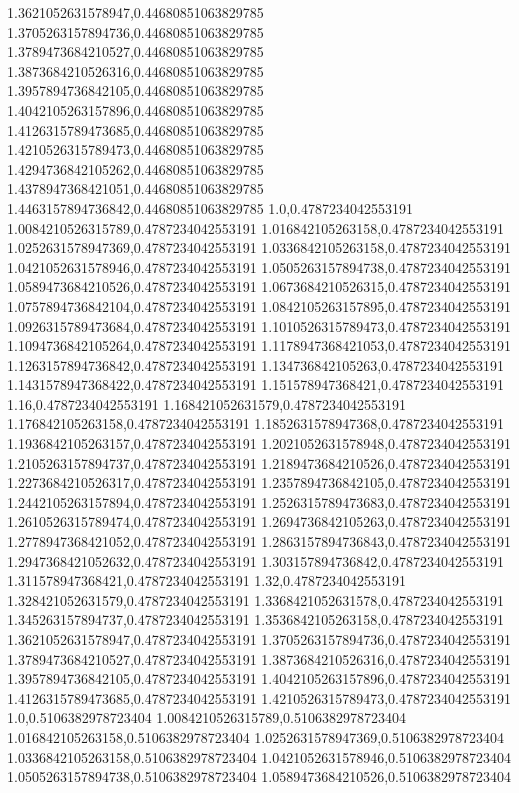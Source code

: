 1.3621052631578947,0.44680851063829785
1.3705263157894736,0.44680851063829785
1.3789473684210527,0.44680851063829785
1.3873684210526316,0.44680851063829785
1.3957894736842105,0.44680851063829785
1.4042105263157896,0.44680851063829785
1.4126315789473685,0.44680851063829785
1.4210526315789473,0.44680851063829785
1.4294736842105262,0.44680851063829785
1.4378947368421051,0.44680851063829785
1.4463157894736842,0.44680851063829785
1.0,0.4787234042553191
1.0084210526315789,0.4787234042553191
1.016842105263158,0.4787234042553191
1.0252631578947369,0.4787234042553191
1.0336842105263158,0.4787234042553191
1.0421052631578946,0.4787234042553191
1.0505263157894738,0.4787234042553191
1.0589473684210526,0.4787234042553191
1.0673684210526315,0.4787234042553191
1.0757894736842104,0.4787234042553191
1.0842105263157895,0.4787234042553191
1.0926315789473684,0.4787234042553191
1.1010526315789473,0.4787234042553191
1.1094736842105264,0.4787234042553191
1.1178947368421053,0.4787234042553191
1.1263157894736842,0.4787234042553191
1.134736842105263,0.4787234042553191
1.1431578947368422,0.4787234042553191
1.151578947368421,0.4787234042553191
1.16,0.4787234042553191
1.168421052631579,0.4787234042553191
1.176842105263158,0.4787234042553191
1.1852631578947368,0.4787234042553191
1.1936842105263157,0.4787234042553191
1.2021052631578948,0.4787234042553191
1.2105263157894737,0.4787234042553191
1.2189473684210526,0.4787234042553191
1.2273684210526317,0.4787234042553191
1.2357894736842105,0.4787234042553191
1.2442105263157894,0.4787234042553191
1.2526315789473683,0.4787234042553191
1.2610526315789474,0.4787234042553191
1.2694736842105263,0.4787234042553191
1.2778947368421052,0.4787234042553191
1.2863157894736843,0.4787234042553191
1.2947368421052632,0.4787234042553191
1.303157894736842,0.4787234042553191
1.311578947368421,0.4787234042553191
1.32,0.4787234042553191
1.328421052631579,0.4787234042553191
1.3368421052631578,0.4787234042553191
1.345263157894737,0.4787234042553191
1.3536842105263158,0.4787234042553191
1.3621052631578947,0.4787234042553191
1.3705263157894736,0.4787234042553191
1.3789473684210527,0.4787234042553191
1.3873684210526316,0.4787234042553191
1.3957894736842105,0.4787234042553191
1.4042105263157896,0.4787234042553191
1.4126315789473685,0.4787234042553191
1.4210526315789473,0.4787234042553191
1.0,0.5106382978723404
1.0084210526315789,0.5106382978723404
1.016842105263158,0.5106382978723404
1.0252631578947369,0.5106382978723404
1.0336842105263158,0.5106382978723404
1.0421052631578946,0.5106382978723404
1.0505263157894738,0.5106382978723404
1.0589473684210526,0.5106382978723404
